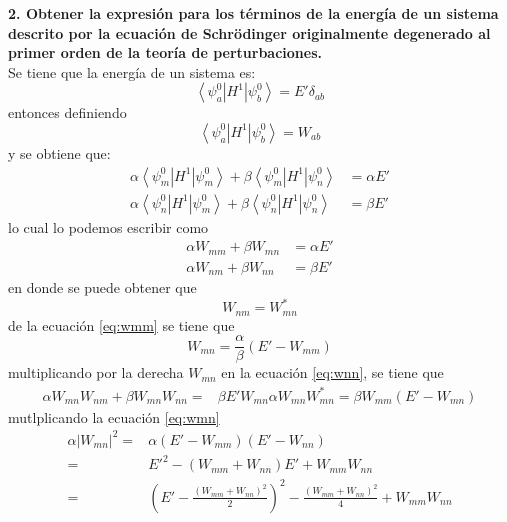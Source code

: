 \textbf{2. Obtener la expresión para los términos de la energía de un sistema descrito por la ecuación de
Schrödinger originalmente degenerado al primer orden de la teoría de perturbaciones.}\\
Se tiene que la energía de un sistema es:
\begin{equation*}
    \left\langle \psi_a^0 \left|H^1 \right|\psi_b^0\right\rangle = E' \delta_{ab}
\end{equation*}
entonces definiendo 
\begin{equation*}
    \left\langle \psi_a^0 \left|H^1 \right|\psi_b^0\right\rangle =W_{ab}
\end{equation*}
y se obtiene que:
\begin{align*}
    \alpha \left\langle \psi_m^0 \left|H^1 \right|\psi_m^0\right\rangle + \beta \left\langle \psi_m^0 \left|H^1 \right|\psi_n^0\right\rangle &= \alpha E'\\
    \alpha \left\langle \psi_n^0 \left|H^1 \right|\psi_m^0\right\rangle + \beta \left\langle \psi_n^0 \left|H^1 \right|\psi_n^0\right\rangle &= \beta E'
\end{align*}
lo cual lo podemos escribir como
\begin{align}
    \label{eq:wmm}
    \alpha W_{mm}+ \beta W_{mn} &= \alpha E' \\
    \label{eq:wnn}
    \alpha W_{nm}+ \beta W_{nn} &= \beta E' 
\end{align}
en donde se puede obtener que
\begin{equation*}
    W_{nm}=W_{mn}^*
\end{equation*}
de la ecuación \ref{eq:wmm} se tiene que
\begin{equation}
    W_{mn}=\frac{\alpha}{\beta} \left(E'-W_{mm}\right)
    \label{eq:wmn}
\end{equation}
multiplicando por la derecha $W_{mn}$ en la ecuación \ref{eq:wnn}, se tiene que
\begin{align*}
    \alpha W_{mn}W_{nm}+ \beta W_{mn}W_{nn} =& \beta E' W_{mn}
    \alpha W_{mn}W_{mn}^* = \beta W_{mm} \left(E'-W_{mn}\right)
\end{align*}
mutlplicando la ecuación \ref{eq:wmn}
\begin{align*}
    \alpha \left| W_{mn}\right|^2 =& \alpha \left(E'-W_{mm}\right)\left(E'-W_{nn}\right)\\
    =& {E}'^2 - (W_{mm}+W_{nn})E' +W_{mm}W_{nn}\\
    =& \left(E'-\frac{\left(W_{mm}+W_{nn}\right)^2}{2}\right)^2- \frac{\left(W_{mm}+W_{nn}\right)^2}{4}+ W_{mm}W_{nn}
\end{align*}
